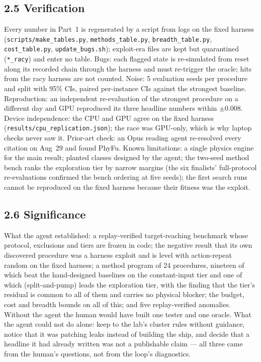\subsection*{2.5 Verification}
Every number in Part~1 is regenerated by a script from logs on the fixed harness (\texttt{scripts/make\_tables.py}, \texttt{methods\_table.py},
\texttt{breadth\_table.py}, \texttt{cost\_table.py}, \texttt{update\_bugs.sh}); exploit-era files are kept but quarantined (\texttt{*\_racy}) and enter
no table. Bugs: each flagged state is re-simulated from reset along its recorded chain through the harness and must re-trigger the oracle; hits from
the racy harness are not counted. Noise: 5 evaluation seeds per procedure and split with 95\% CIs, paired per-instance CIs against the strongest
baseline. Reproduction: an independent re-evaluation of the strongest procedure on a different day and GPU reproduced its three headline numbers within $\pm$0.008. Device independence: the CPU and GPU agree on the fixed harness (\texttt{results/cpu\_replication.json}); the race was GPU-only, which is why
laptop checks never saw it. Prior-art check: an Opus reading agent re-resolved every citation on Aug~29 and found PhyFu. Known limitations: a single
physics engine for the main result; planted classes designed by the agent; the two-seed method bench ranks the exploration tier by narrow margins
(the six finalists' full-protocol re-evaluations confirmed the bench ordering at five seeds); the first search runs cannot be reproduced on the fixed harness because their fitness
was the exploit.

\subsection*{2.6 Significance}
What the agent established: a replay-verified target-reaching benchmark whose protocol, exclusions and tiers are frozen in code; the negative
result that its own discovered procedure was a harness exploit and is level with action-repeat random on the fixed harness; a method program of 24
procedures, nineteen of which beat the hand-designed baselines on the constant-input tier and one of which (split-and-pump) leads the exploration
tier, with the finding that the tier's residual is common to all of them and carries no physical blocker; the budget, cost and breadth bounds on all
of this; and five replay-verified anomalies. Without the agent the human would have built one tester and one oracle. What the agent could not do
alone: keep to the lab's cluster rules without guidance, notice that it was patching leaks instead of building the ship, and decide that a
headline it had already written was not a publishable claim --- all three came from the human's questions, not from the loop's diagnostics.

